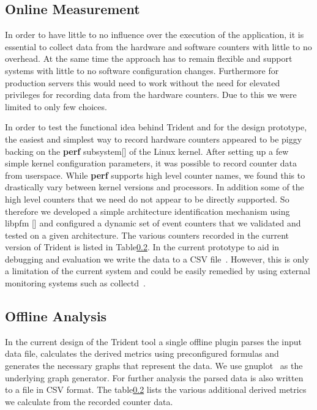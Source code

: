 \documentclass{webofc}
\begin{document}
\subsection{Online Measurement}

In order to have little to no influence over the execution of the application, it is essential to collect data from the hardware and software counters with little to no overhead. At the same time the approach has to remain flexible and support systems with little to no software configuration changes. Furthermore for production servers this would need to work without the need for elevated privileges for recording data from the hardware counters. Due to this we were limited to only few choices. 

In order to test the functional idea behind Trident and for the design prototype, the easiest and simplest way to record hardware counters appeared to be piggy backing on the \textbf{perf} subsystem[] of the Linux kernel. After setting up a few simple kernel configuration parameters, it was possible to record counter data from userspace. While \textbf{perf} supports high level counter names, we found this to drastically vary between kernel versions and processors. In addition some of the high level counters that we need do not appear to be directly supported. So therefore we developed a simple architecture identification mechanism using libpfm [] and configured a dynamic set of event counters that we validated and tested on a given architecture. The various counters recorded in the current version of Trident is listed in Table\ref{}. In the current prototype to aid in debugging and evaluation we write the data to a CSV file~\cite{}. However, this is only a limitation of the current system and could be easily remedied by using external monitoring systems such as collectd~\cite{}.

\subsection{Offline Analysis}

In the current design of the Trident tool a single offline plugin parses the input data file, calculates the derived metrics using preconfigured formulas and generates the necessary graphs that represent the data. We use gnuplot~\cite{} as the underlying graph generator. For further analysis the parsed data is also written to a file in CSV format. The table\ref{} lists the various additional derived metrics we calculate from the recorded counter data.
\end{document}
